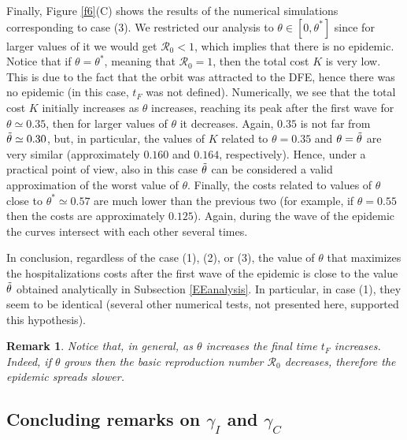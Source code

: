 \documentclass[11pt,reqno]{amsart}
\theoremstyle{boldremark}
\newtheorem{remark}{Remark}
\begin{document}
Finally, Figure \ref{f6}(C) shows the results of the numerical simulations corresponding to case (3). We restricted our analysis to $\theta \in [0, \theta^*]$ since for larger values of it we would get $\mathcal{R}_0 < 1$, which implies that there is no epidemic. Notice that if $\theta=\theta^*$, meaning that $\mathcal{R}_0=1$, then the total cost $K$ is very low. This is due to the fact that the orbit was attracted to the DFE, hence there was no epidemic (in this case, $t_F$ was not defined). Numerically, we see that the total cost $K$ initially increases as $\theta$ increases, reaching its peak after the first wave for $\theta \simeq 0.35$, then for larger values of $\theta$ it decreases. Again, $0.35$ is not far from $\Tilde{\theta} \simeq 0.30$, but, in particular, the values of $K$ related to $\theta = 0.35$ and $\theta=\Tilde{\theta}$ are very similar (approximately $0.160$ and $0.164$, respectively). Hence, under a practical point of view, also in this case $\Tilde{\theta}$ can be considered a valid approximation of the worst value of $\theta$. Finally, the costs related to values of $\theta$ close to $\theta^* \simeq 0.57$ are much lower than the previous two (for example, if $\theta=0.55$ then the costs are approximately $0.125$). Again, during the wave of the epidemic the curves intersect with each other several times. 

In conclusion, regardless of the case (1), (2), or (3), the value of $\theta$ that maximizes the hospitalizations costs after the first wave of the epidemic is close to the value $\Tilde{\theta}$ obtained analytically in Subsection \ref{EEanalysis}. In particular, in case (1), they seem to be identical (several other numerical tests, not presented here, supported this hypothesis). 

\begin{remark}
    Notice that, in general, as $\theta$ increases the final time $t_F$ increases. Indeed, if $\theta$ grows then  the basic reproduction number $\mathcal{R}_0$ decreases, therefore the epidemic spreads slower. 
\end{remark}

\subsection{Concluding remarks on $\gamma_I$ and $\gamma_C$}
\end{document}

